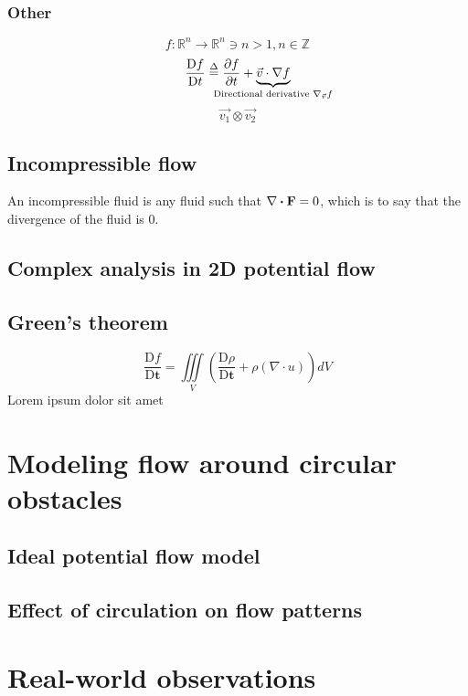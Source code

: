 \documentclass[a4paper,12pt]{article}
\renewcommand\divergence[1]{\nabla\vdot#1}
\newcommand{\fatf}{\mathbf{F}}         		%
\newcommand{\partialder}[2]{\frac{\partial #1}{\partial #2}}        %
\newcommand{\materialder}[2]{\frac{\mathrm{D} #1}{\mathrm{D} #2}}   %
\newcommand{\definedas}{\stackrel{\Delta}{=}}     								%
\begin{document}
\subsubsection*{Other}
$$f:\mathbb{R}^n\rightarrow\mathbb{R}^n\ni n>1,n\in\mathbb{Z}$$
\begin{equation}
	\materialder{f}{t}\definedas\partialder{f}{t}+\underbrace{\vec{v}\cdot\nabla f}_{\hidewidth\text{Directional derivative }\nabla_{\vec{v}}f\hidewidth}
\end{equation}
$$\vec{v_1}\otimes\vec{v_2}$$

\subsection{Incompressible flow}
An incompressible fluid is any fluid such that $\divergence\fatf=0$, which is to say that the divergence of the fluid is 0.

\subsection{Complex analysis in 2D potential flow}

\subsection*{Green's theorem}\label{sec:greenstheorem}
\begin{equation} %
	\materialder{f}{\mathbf{t}}=\iiint\limits_{V}(\materialder{\rho}{\mathbf{t}}+\rho(\nabla\cdot u))dV
\end{equation}
Lorem ipsum dolor sit amet \cite{peyret2012computational}

\section{Modeling flow around circular obstacles}
\subsection{Ideal potential flow model}
\subsection{Effect of circulation on flow patterns}
\section{Real-world observations}
\end{document}
